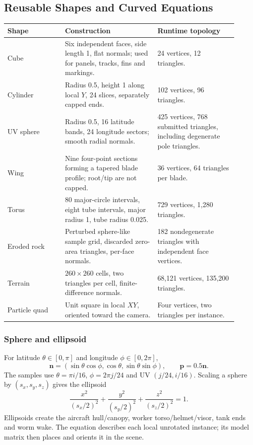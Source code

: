 \subsection{Reusable Shapes and Curved Equations}
\begin{longtable}{L{0.23\linewidth}L{0.37\linewidth}L{0.32\linewidth}}
\toprule\textbf{Shape}&\textbf{Construction}&\textbf{Runtime topology}\\\midrule\endhead
Cube & Six independent faces, side length 1, flat normals; used for panels, tracks, fins and markings. & 24 vertices, 12 triangles.\\
Cylinder & Radius 0.5, height 1 along local $Y$, 24 slices, separately capped ends. & 102 vertices, 96 triangles.\\
UV sphere & Radius 0.5, 16 latitude bands, 24 longitude sectors; smooth radial normals. & 425 vertices, 768 submitted triangles, including degenerate pole triangles.\\
Wing & Nine four-point sections forming a tapered blade profile; root/tip are not capped. & 36 vertices, 64 triangles per blade.\\
Torus & 80 major-circle intervals, eight tube intervals, major radius 1, tube radius 0.025. & 729 vertices, 1,280 triangles.\\
Eroded rock & Perturbed sphere-like sample grid, discarded zero-area triangles, per-face normals. & 182 nondegenerate triangles with independent face vertices.\\
Terrain & $260\times260$ cells, two triangles per cell, finite-difference normals. & 68,121 vertices, 135,200 triangles.\\
Particle quad & Unit square in local $XY$, oriented toward the camera. & Four vertices, two triangles per instance.\\
\bottomrule
\end{longtable}

\subsubsection{Sphere and ellipsoid}
For latitude $\theta\in[0,\pi]$ and longitude $\phi\in[0,2\pi]$,
\begin{equation}
\mathbf n=(\sin\theta\cos\phi,\cos\theta,\sin\theta\sin\phi),\qquad \mathbf p=0.5\mathbf n.
\end{equation}
The samples use $\theta=\pi i/16$, $\phi=2\pi j/24$ and UV $(j/24,i/16)$. Scaling a sphere by $(s_x,s_y,s_z)$ gives the ellipsoid
\begin{equation}
\frac{x^2}{(s_x/2)^2}+\frac{y^2}{(s_y/2)^2}+\frac{z^2}{(s_z/2)^2}=1.
\end{equation}
Ellipsoids create the aircraft hull/canopy, worker torso/helmet/visor, tank ends and worm wake. The equation describes each local unrotated instance; its model matrix then places and orients it in the scene.

